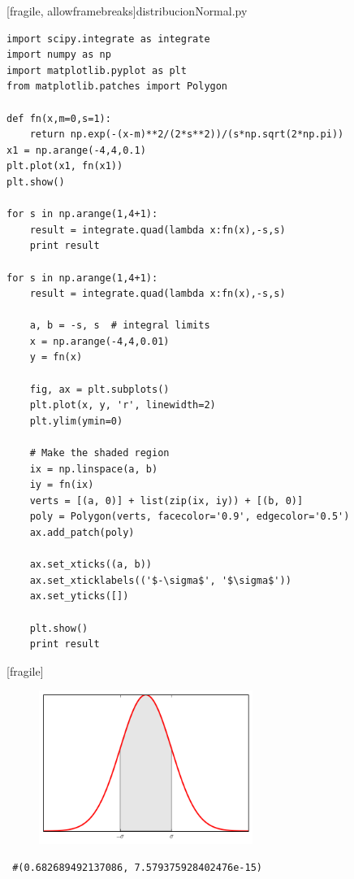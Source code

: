 [fragile, allowframebreaks]{distribucionNormal.py}
 \begin{verbatim}
import scipy.integrate as integrate
import numpy as np
import matplotlib.pyplot as plt
from matplotlib.patches import Polygon

def fn(x,m=0,s=1):
    return np.exp(-(x-m)**2/(2*s**2))/(s*np.sqrt(2*np.pi))
x1 = np.arange(-4,4,0.1)
plt.plot(x1, fn(x1))
plt.show()

for s in np.arange(1,4+1):
    result = integrate.quad(lambda x:fn(x),-s,s)
    print result

for s in np.arange(1,4+1):
    result = integrate.quad(lambda x:fn(x),-s,s)

    a, b = -s, s  # integral limits
    x = np.arange(-4,4,0.01)
    y = fn(x)

    fig, ax = plt.subplots()
    plt.plot(x, y, 'r', linewidth=2)
    plt.ylim(ymin=0)

    # Make the shaded region
    ix = np.linspace(a, b)
    iy = fn(ix)
    verts = [(a, 0)] + list(zip(ix, iy)) + [(b, 0)]
    poly = Polygon(verts, facecolor='0.9', edgecolor='0.5')
    ax.add_patch(poly)

    ax.set_xticks((a, b))
    ax.set_xticklabels(('$-\sigma$', '$\sigma$'))
    ax.set_yticks([])

    plt.show()
    print result
 \end{verbatim}


[fragile]
 \begin{figure}
 \centering
 \includegraphics[height=5cm,keepaspectratio=true]{./pe/norm1.png}
 \label{fig:norm1}
\end{figure}
\begin{verbatim}
 #(0.682689492137086, 7.579375928402476e-15)
\end{verbatim}


